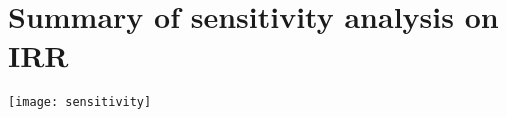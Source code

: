 \section{Summary of sensitivity analysis on IRR}
\label{app:irr-sensitivity}

\begin{table}[H]
    \centering
    \texttt{[image: sensitivity]}
    \label{tab:de-proscons}
\end{table}
